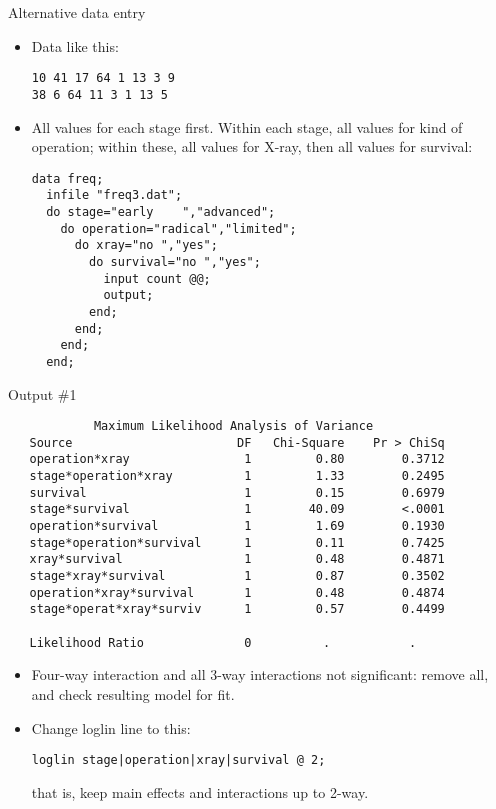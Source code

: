 \documentclass[pdf]{prosper}
\begin{document}
\begin{slide}{Alternative data entry}

  \begin{itemize}
  \item Data like this:
\begin{verbatim}
10 41 17 64 1 13 3 9
38 6 64 11 3 1 13 5
\end{verbatim}
  \item All values for each stage first. Within each stage, all values for kind of operation; within these, all values for X-ray, then all values for survival:

{\scriptsize
\begin{verbatim}
data freq;
  infile "freq3.dat";
  do stage="early    ","advanced";
    do operation="radical","limited";
      do xray="no ","yes";
        do survival="no ","yes";
          input count @@;
          output;
        end;
      end;
    end;
  end;       
\end{verbatim}
}
  \end{itemize}
  
\end{slide}

\begin{slide}{Output \#1}

{\scriptsize
\begin{verbatim}
            Maximum Likelihood Analysis of Variance
   Source                       DF   Chi-Square    Pr > ChiSq
   operation*xray                1         0.80        0.3712
   stage*operation*xray          1         1.33        0.2495
   survival                      1         0.15        0.6979
   stage*survival                1        40.09        <.0001
   operation*survival            1         1.69        0.1930
   stage*operation*survival      1         0.11        0.7425
   xray*survival                 1         0.48        0.4871
   stage*xray*survival           1         0.87        0.3502
   operation*xray*survival       1         0.48        0.4874
   stage*operat*xray*surviv      1         0.57        0.4499

   Likelihood Ratio              0          .           .
\end{verbatim}
}

\begin{itemize}
\item Four-way interaction and all 3-way interactions not significant: remove all, and check resulting model for fit.
\item Change loglin line to this:

\begin{verbatim}
loglin stage|operation|xray|survival @ 2;
\end{verbatim}

that is, keep main effects and interactions up to 2-way.
\end{itemize}
  
\end{slide}
\end{document}

